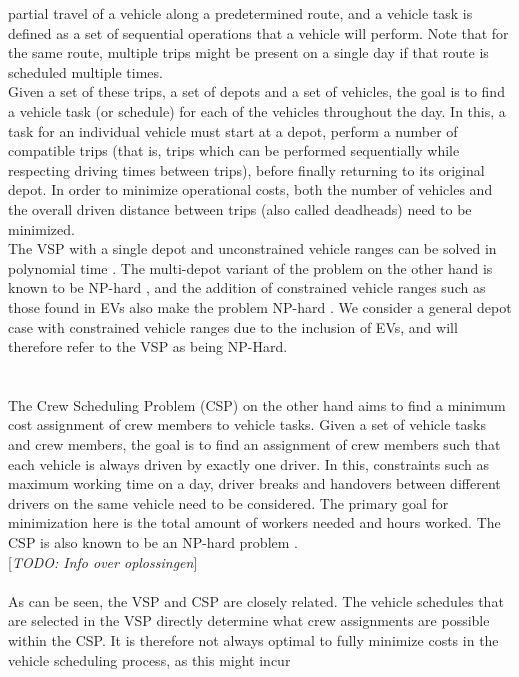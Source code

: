 \documentclass[ht]{article}
\newcommand{\todo}[1]{{\color{red}[\textit{TODO: #1}]}}
\begin{document}
partial travel of a vehicle along a predetermined route, and a vehicle task is
defined as a set of sequential operations that a vehicle will perform. Note
that for the same route, multiple trips might be present on a single day if
that route is scheduled multiple times. \\ Given a set of these trips, a set of
depots and a set of vehicles, the goal is to find a vehicle task (or schedule)
for each of the vehicles throughout the day. In this, a task for an individual
vehicle must start at a depot, perform a number of compatible trips (that is,
trips which can be performed sequentially while respecting driving times
between trips), before finally returning to its original depot. In order to
minimize operational costs, both the number of vehicles and the overall driven
distance between trips (also called deadheads) need to be minimized. \\ The VSP
with a single depot and unconstrained vehicle ranges can be solved in
polynomial time \cite{Freling2003SDVSP}. The multi-depot variant of the problem
on the other hand is known to be NP-hard \cite{Bodin1983, Bertossi1987,
  Even1975}, and the addition of constrained vehicle ranges such as those found
in EVs also make the problem NP-hard \cite{Bodin1983, Sassi2014}. We consider a
general depot case with constrained vehicle ranges due to the inclusion of EVs,
and will therefore refer to the VSP as being NP-Hard. \\ \\\\ The Crew
Scheduling Problem (CSP) on the other hand aims to find a minimum cost
assignment of crew members to vehicle tasks. Given a set of vehicle tasks and
crew members, the goal is to find an assignment of crew members such that each
vehicle is always driven by exactly one driver. In this, constraints such as
maximum working time on a day, driver breaks and handovers between different
drivers on the same vehicle need to be considered. The primary goal for
minimization here is the total amount of workers needed and hours worked. The
CSP is also known to be an NP-hard problem \cite{Fischetti1989}.\\ \todo{Info
  over oplossingen} \\\\ As can be seen, the VSP and CSP are closely related. The
vehicle schedules that are selected in the VSP directly determine what crew
assignments are possible within the CSP. It is therefore not always optimal to
fully minimize costs in the vehicle scheduling process, as this might incur
\end{document}

